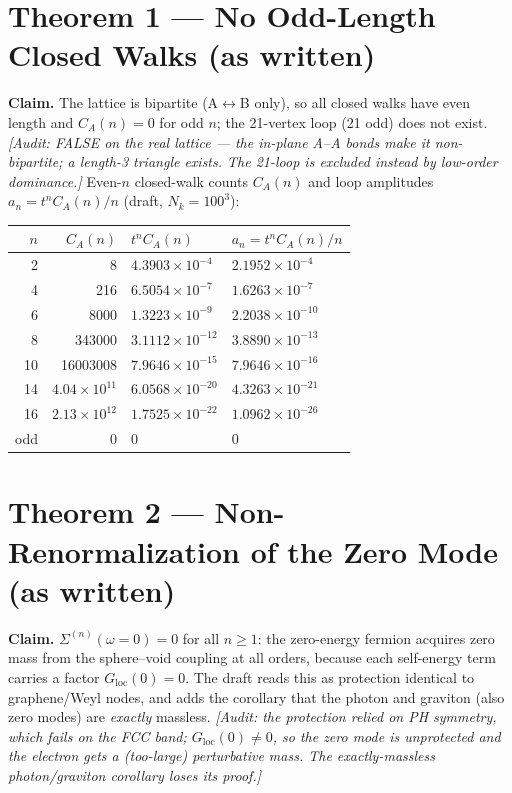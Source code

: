 \documentclass[aps,prl,preprint,superscriptaddress,floatfix]{revtex4-2}
\newcommand{\Gloc}{G_{\mathrm{loc}}}
\begin{document}
\section{Theorem 1 --- No Odd-Length Closed Walks (as written)}
\textbf{Claim.} The lattice is bipartite (A$\leftrightarrow$B only), so all closed walks have even
length and $C_A(n)=0$ for odd $n$; the 21-vertex loop (21 odd) does not exist.
\emph{[Audit: FALSE on the real lattice --- the in-plane A--A bonds make it non-bipartite; a
length-3 triangle exists. The 21-loop is excluded instead by low-order dominance.]}
Even-$n$ closed-walk counts $C_A(n)$ and loop amplitudes $a_n=t^nC_A(n)/n$ (draft, $N_k=100^3$):
\begin{table}[h]\centering
\begin{tabular}{rrll}
\toprule
$n$ & $C_A(n)$ & $t^nC_A(n)$ & $a_n=t^nC_A(n)/n$ \\
\midrule
2 & 8 & $4.3903\times10^{-4}$ & $2.1952\times10^{-4}$ \\
4 & 216 & $6.5054\times10^{-7}$ & $1.6263\times10^{-7}$ \\
6 & 8000 & $1.3223\times10^{-9}$ & $2.2038\times10^{-10}$ \\
8 & 343000 & $3.1112\times10^{-12}$ & $3.8890\times10^{-13}$ \\
10 & 16003008 & $7.9646\times10^{-15}$ & $7.9646\times10^{-16}$ \\
14 & $4.04\times10^{11}$ & $6.0568\times10^{-20}$ & $4.3263\times10^{-21}$ \\
16 & $2.13\times10^{12}$ & $1.7525\times10^{-22}$ & $1.0962\times10^{-26}$ \\
odd & 0 & 0 & 0 \\
\bottomrule
\end{tabular}
\end{table}

\section{Theorem 2 --- Non-Renormalization of the Zero Mode (as written)}
\textbf{Claim.} $\Sigma^{(n)}(\omega{=}0)=0$ for all $n\ge1$: the zero-energy fermion acquires zero
mass from the sphere--void coupling at all orders, because each self-energy term carries a factor
$\Gloc(0)=0$. The draft reads this as protection identical to graphene/Weyl nodes, and adds the
corollary that the photon and graviton (also zero modes) are \emph{exactly} massless.
\emph{[Audit: the protection relied on PH symmetry, which fails on the FCC band; $\Gloc(0)\neq0$, so
the zero mode is unprotected and the electron gets a (too-large) perturbative mass. The
exactly-massless photon/graviton corollary loses its proof.]}
\end{document}
